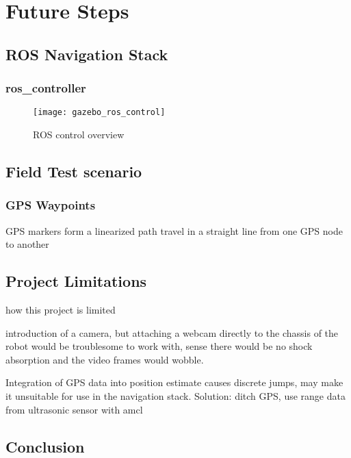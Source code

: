 \chapter{Future Steps}

\section{ROS Navigation Stack}

\subsection{ros\_controller}
\begin{figure}[h]
	\caption{ROS control overview \cite{fig_ros_control}}
	\texttt{[image: gazebo\_ros\_control]}
	\label{fig:ros_controller}
\end{figure}

\section{Field Test scenario}

\subsection{GPS Waypoints}
GPS markers form a linearized path
travel in a straight line from one GPS node to another


\section{Project Limitations}
how this project is limited

introduction of a camera, but attaching a webcam directly to the chassis of the robot would be troublesome to work with, sense there would be no shock absorption and the video frames would wobble.

Integration of GPS data into position estimate causes discrete jumps, may make it unsuitable for use in the navigation stack. Solution: ditch GPS, use range data from ultrasonic sensor with amcl


\section{Conclusion}
